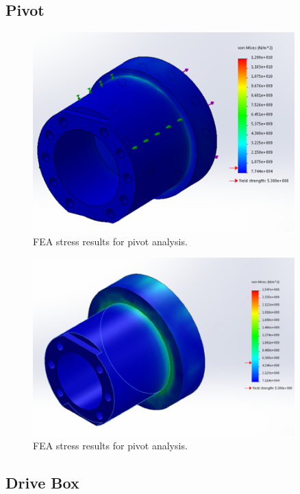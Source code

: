 \subsection{Pivot}\label{sec:pivot_fea}

\begin{figure}[H]
\centering
\includegraphics[width=0.9\textwidth]{images/FEA_pivotfinal}
\caption[Pivot FEA Stress Results]{FEA stress results for pivot analysis.}
\label{fig:pivot_stress_fea}
\end{figure}

\begin{figure}[H]
\centering
\includegraphics[width=0.9\textwidth]{images/FEA_pivotold}
\caption[Pivot FEA Stress Results]{FEA stress results for pivot analysis.}
\label{fig:old_pivot_stress_fea}
\end{figure}


\subsection{Drive Box}\label{sec:box_fea}

